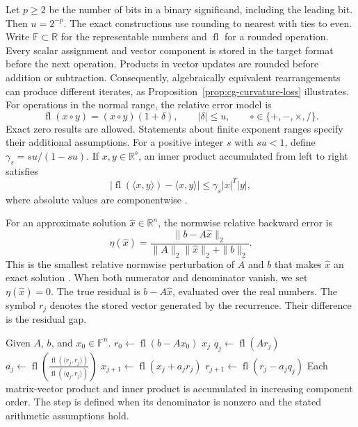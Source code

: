 \documentclass[11pt]{article}
\theoremstyle{definition}
\newcommand{\fl}{\operatorname{fl}}
\newcommand{\R}{\mathbb{R}}
\begin{document}
Let $p\ge2$ be the number of bits in a binary significand, including the
leading bit. Then $u=2^{-p}$. The exact constructions use rounding to
nearest with ties to even. Write $\mathbb F\subset\R$ for the representable
numbers and $\fl$ for a rounded operation. Every scalar assignment and vector
component is stored in the target format before the next operation.
Products in vector updates are rounded before addition or subtraction.
Consequently, algebraically equivalent rearrangements can produce different
iterates, as Proposition~\ref{prop:cg-curvature-loss} illustrates.
For operations in the normal range, the relative error model is
\begin{equation}
 \fl(x\circ y)=(x\circ y)(1+\delta),\qquad
 |\delta|\le u,\qquad \circ\in\{+,-,\times,/\}.
 \label{eq:relative-rounding-model}
\end{equation}
Exact zero results are allowed. Statements about finite exponent ranges
specify their additional assumptions.
For a positive integer $s$ with $su<1$, define $\gamma_s=su/(1-su)$.
If $x,y\in\R^s$, an inner product accumulated from left to right satisfies
\begin{equation}
 |\fl(\langle x,y\rangle)-\langle x,y\rangle|
 \le\gamma_s|x|^T|y|,
 \label{eq:dot-error-model}
\end{equation}
where absolute values are componentwise \cite[Chap.~3]{Higham2002}.

For an approximate solution $\widehat x\in\R^n$, the normwise relative
backward error is
\begin{equation}
 \eta(\widehat x)=\frac{\|b-A\widehat x\|_2}
 {\|A\|_2\|\widehat x\|_2+\|b\|_2}.
 \label{eq:backward-error}
\end{equation}
This is the smallest relative normwise perturbation of $A$ and $b$ that
makes $\widehat x$ an exact solution \cite{RigalGaches1967,Higham2002}.
When both numerator and denominator vanish, we set $\eta(\widehat x)=0$.
The true residual is $b- A\widehat x$, evaluated over the real numbers.
The symbol $r_j$ denotes the stored vector generated by the recurrence.
Their difference is the residual gap.

\begin{algorithm}[htbp]
\caption{Steepest descent with a recursively updated residual}
\label{alg:sd}
\begin{algorithmic}[1]
\Statex Given $A$, $b$, and $x_0\in\mathbb F^n$.
\State $r_0\gets\fl(b-Ax_0)$
    \State \Return $x_j$
  \EndIf
  \State $q_j\gets\fl(Ar_j)$
  \State $a_j\gets\displaystyle\fl\!\left(
    \frac{\fl(\langle r_j,r_j\rangle)}{\fl(\langle q_j,r_j\rangle)}\right)$
  \State $x_{j+1}\gets\fl(x_j+a_jr_j)$
  \State $r_{j+1}\gets\fl(r_j-a_jq_j)$
\EndFor
\Statex Each matrix-vector product and inner product is accumulated in increasing
component order. The step is defined when its denominator is nonzero and
the stated arithmetic assumptions hold.
\end{algorithmic}
\end{algorithm}
\end{document}
